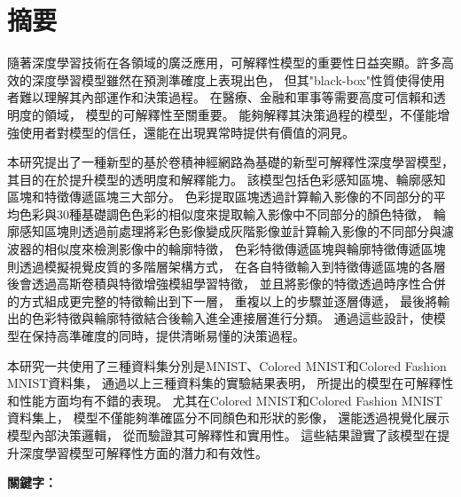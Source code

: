 \documentclass[class=NCU_thesis, crop=false]{standalone}
\begin{document}
\chapter{摘要}

隨著深度學習技術在各領域的廣泛應用，可解釋性模型的重要性日益突顯。許多高效的深度學習模型雖然在預測準確度上表現出色，
但其"black-box"性質使得使用者難以理解其內部運作和決策過程。
在醫療、金融和軍事等需要高度可信賴和透明度的領域，
模型的可解釋性至關重要。
能夠解釋其決策過程的模型，不僅能增強使用者對模型的信任，還能在出現異常時提供有價值的洞見。

本研究提出了一種新型的基於卷積神經網路為基礎的新型可解釋性深度學習模型，
其目的在於提升模型的透明度和解釋能力。
該模型包括色彩感知區塊、輪廓感知區塊和特徵傳遞區塊三大部分。
色彩提取區塊透過計算輸入影像的不同部分的平均色彩與30種基礎調色色彩的相似度來提取輸入影像中不同部分的顏色特徵，
輪廓感知區塊則透過前處理將彩色影像變成灰階影像並計算輸入影像的不同部分與濾波器的相似度來檢測影像中的輪廓特徵，
色彩特徵傳遞區塊與輪廓特徵傳遞區塊則透過模擬視覺皮質的多階層架構方式，
在各自特徵輸入到特徵傳遞區塊的各層後會透過高斯卷積與特徵增強模組學習特徵，
並且將影像的特徵透過時序性合併的方式組成更完整的特徵輸出到下一層，
重複以上的步驟並逐層傳遞，
最後將輸出的色彩特徵與輪廓特徵結合後輸入進全連接層進行分類。
通過這些設計，使模型在保持高準確度的同時，提供清晰易懂的決策過程。

本研究一共使用了三種資料集分別是MNIST、Colored MNIST和Colored Fashion MNIST資料集，
通過以上三種資料集的實驗結果表明，
所提出的模型在可解釋性和性能方面均有不錯的表現。
尤其在Colored MNIST和Colored Fashion MNIST資料集上，
模型不僅能夠準確區分不同顏色和形狀的影像，
還能透過視覺化展示模型內部決策邏輯，
從而驗證其可解釋性和實用性。
這些結果證實了該模型在提升深度學習模型可解釋性方面的潛力和有效性。

\vspace{2em}
\noindent \textbf{關鍵字：} \keywordsZh{} %
\end{document}
